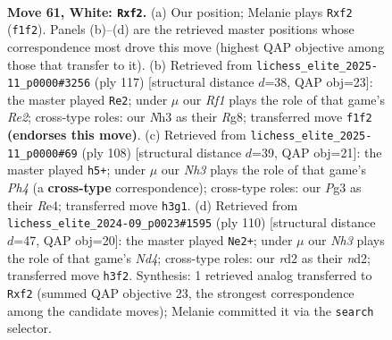 \documentclass[11pt]{article}
\begin{document}
\clearpage

\begin{figure}[p]\centering
\begin{subfigure}{0.46\textwidth}\centering
\resizebox{\linewidth}{!}{%
\newchessgame
\chessboard[
  setfen={8/6k1/1pb5/p1p5/8/1K4PN/2rr1p1P/5R2 w - - 4 61},
  showmover=false,
  pgfstyle=straightmove, color=movearrow, markmove={f1-f2}
]}
\caption{}
\end{subfigure}\hfill
\begin{subfigure}{0.46\textwidth}\centering
\resizebox{\linewidth}{!}{%
\newchessgame
\chessboard[
  setfen={6r1/4r3/6P1/1R5P/3P3K/P7/k7/1R6 b - - 0 59},
  showmover=false,
  pgfstyle=straightmove, color=movearrow, markmove={e7-e2}
]}
\caption{}
\end{subfigure}
\\[4pt]
\begin{subfigure}{0.46\textwidth}\centering
\resizebox{\linewidth}{!}{%
\newchessgame
\chessboard[
  setfen={8/6p1/5pk1/R7/4R1pP/6P1/1r3r2/6K1 w - - 0 55},
  showmover=false,
  pgfstyle=straightmove, color=movearrow, markmove={h4-h5}
]}
\caption{}
\end{subfigure}\hfill
\begin{subfigure}{0.46\textwidth}\centering
\resizebox{\linewidth}{!}{%
\newchessgame
\chessboard[
  setfen={8/1p2R3/8/p6p/P2N1k1P/6p1/3n1r2/6K1 w - - 3 56},
  showmover=false,
  pgfstyle=straightmove, color=movearrow, markmove={d4-e2}
]}
\caption{}
\end{subfigure}
\caption{\textbf{Move 61, White: \texttt{Rxf2}.} (a) Our position; Melanie plays \texttt{Rxf2} (\texttt{f1f2}). Panels (b)--(d) are the retrieved master positions whose correspondence most drove this move (highest QAP objective among those that transfer to it). (b) Retrieved from \texttt{lichess\_elite\_2025-11\_p0000\#3256} (ply 117) [structural distance $d$=38, QAP obj=23]: the master played \texttt{Re2}; under $\mu$ our \emph{Rf1} plays the role of that game's \emph{Re2}; cross-type roles: our \emph{N}h3 as their \emph{R}g8; transferred move \texttt{f1f2} \textbf{(endorses this move)}. (c) Retrieved from \texttt{lichess\_elite\_2025-11\_p0000\#69} (ply 108) [structural distance $d$=39, QAP obj=21]: the master played \texttt{h5+}; under $\mu$ our \emph{Nh3} plays the role of that game's \emph{Ph4} (a \textbf{cross-type} correspondence); cross-type roles: our \emph{P}g3 as their \emph{R}e4; transferred move \texttt{h3g1}. (d) Retrieved from \texttt{lichess\_elite\_2024-09\_p0023\#1595} (ply 110) [structural distance $d$=47, QAP obj=20]: the master played \texttt{Ne2+}; under $\mu$ our \emph{Nh3} plays the role of that game's \emph{Nd4}; cross-type roles: our \emph{r}d2 as their \emph{n}d2; transferred move \texttt{h3f2}. Synthesis: 1 retrieved analog transferred to \texttt{Rxf2} (summed QAP objective 23, the strongest correspondence among the candidate moves); Melanie committed it via the \texttt{search} selector.}
\label{fig:thought-m120}
\end{figure}
\end{document}

